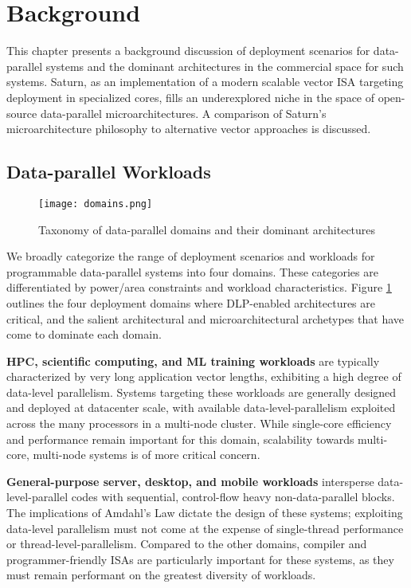 \newpage
\section{Background}
\label{sec:background}

This chapter presents a background discussion of deployment scenarios for data-parallel systems and the dominant architectures in the commercial space for such systems.
Saturn, as an implementation of a modern scalable vector ISA targeting deployment in specialized cores, fills an underexplored niche in the space of open-source data-parallel microarchitectures.
A comparison of Saturn's microarchitecture philosophy to alternative vector approaches is discussed.

\subsection{Data-parallel Workloads}

\begin{figure}[h]
  \centering
\texttt{[image: domains.png]}
\caption{Taxonomy of data-parallel domains and their dominant architectures}
\label{fig:taxonomy}
\end{figure}

We broadly categorize the range of deployment scenarios and workloads for programmable data-parallel systems into four domains.
These categories are differentiated by power/area constraints and workload characteristics.
Figure \ref{fig:taxonomy} outlines the four deployment domains where DLP-enabled architectures are critical, and the salient architectural and microarchitectural archetypes that have come to dominate each domain.

\textbf{HPC, scientific computing, and ML training workloads} are typically characterized by very long application vector lengths, exhibiting a high degree of data-level parallelism.
Systems targeting these workloads are generally designed and deployed at datacenter scale, with available data-level-parallelism exploited across the many processors in a multi-node cluster.
While single-core efficiency and performance remain important for this domain, scalability towards multi-core, multi-node systems is of more critical concern.

\textbf{General-purpose server, desktop, and mobile workloads} intersperse data-level-parallel codes with sequential, control-flow heavy non-data-parallel blocks.
The implications of Amdahl's Law dictate the design of these systems; exploiting data-level parallelism must not come at the expense of single-thread performance or thread-level-parallelism.
Compared to the other domains, compiler and programmer-friendly ISAs are particularly important for these systems, as they must remain performant on the greatest diversity of workloads.

